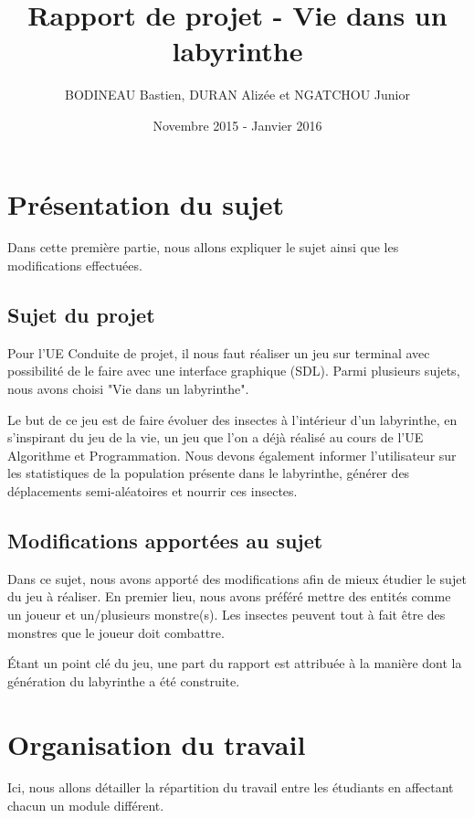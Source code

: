 \documentclass[a4paper,11pt]{report}
\title{Rapport de projet - Vie dans un labyrinthe}
\author{BODINEAU Bastien, DURAN Alizée et NGATCHOU Junior}
\date{Novembre 2015 - Janvier 2016}
\begin{document}
  \maketitle
  \tableofcontents

  \chapter{Présentation du sujet}
  Dans cette première partie, nous allons expliquer le sujet ainsi que les modifications effectuées.
    \section{Sujet du projet}
    Pour l'UE Conduite de projet, il nous faut réaliser un jeu sur terminal avec possibilité de le faire avec une interface graphique (SDL). Parmi plusieurs sujets, nous avons choisi "Vie dans un labyrinthe". 

    Le but de ce jeu est de faire évoluer des insectes à l'intérieur d'un labyrinthe, en s'inspirant du jeu de la vie, un jeu que l'on a déjà réalisé au cours de l'UE Algorithme et Programmation. Nous devons également informer l'utilisateur sur les statistiques de la population présente dans le labyrinthe, générer des déplacements semi-aléatoires et nourrir ces insectes.
    \section{Modifications apportées au sujet}
    Dans ce sujet, nous avons apporté des modifications afin de mieux étudier le sujet du jeu à réaliser. En premier lieu, nous avons préféré mettre des entités comme un joueur et un/plusieurs monstre(s). Les insectes peuvent tout à fait être des monstres que le joueur doit combattre.

    Étant un point clé du jeu, une part du rapport est attribuée à la manière dont la génération du labyrinthe a été construite.
  \chapter{Organisation du travail}
  Ici, nous allons détailler la répartition du travail entre les étudiants en affectant chacun un module différent.
\end{document}
